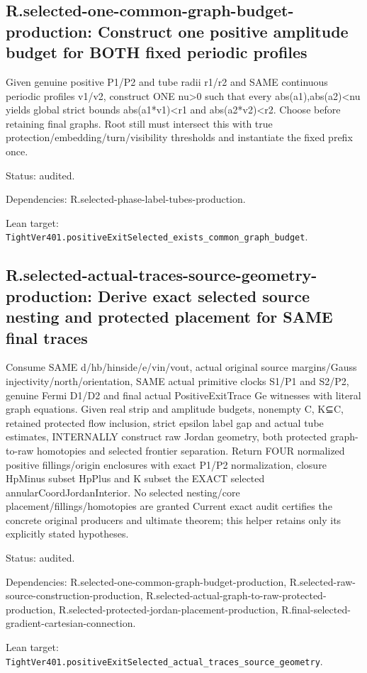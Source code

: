 \documentclass{article}
\begin{document}
\subsection*{R.selected-one-common-graph-budget-production: Construct one positive amplitude budget for BOTH fixed periodic profiles}
Given genuine positive P1/P2 and tube radii r1/r2 and SAME continuous periodic profiles v1/v2, construct ONE nu>0 such that every abs(a1),abs(a2)<nu yields global strict bounds abs(a1*v1)<r1 and abs(a2*v2)<r2. Choose before retaining final graphs. Root still must intersect this with true protection/embedding/turn/visibility thresholds and instantiate the fixed prefix once.
\par Status: audited.
\par Dependencies: R.selected-phase-label-tubes-production.
\par Lean target: \texttt{TightVer401.positiveExitSelected\_exists\_common\_graph\_budget}.
\subsection*{R.selected-actual-traces-source-geometry-production: Derive exact selected source nesting and protected placement for SAME final traces}
Consume SAME d/hb/hinside/e/vin/vout, actual original source margins/Gauss injectivity/north/orientation, SAME actual primitive clocks S1/P1 and S2/P2, genuine Fermi D1/D2 and final actual PositiveExitTrace Ge witnesses with literal graph equations. Given real strip and amplitude budgets, nonempty C, K⊆C, retained protected flow inclusion, strict epsilon label gap and actual tube estimates, INTERNALLY construct raw Jordan geometry, both protected graph-to-raw homotopies and selected frontier separation. Return FOUR normalized positive fillings/origin enclosures with exact P1/P2 normalization, closure HpMinus subset HpPlus and K subset the EXACT selected annularCoordJordanInterior. No selected nesting/core placement/fillings/homotopies are granted Current exact audit certifies the concrete original producers and ultimate theorem; this helper retains only its explicitly stated hypotheses.
\par Status: audited.
\par Dependencies: R.selected-one-common-graph-budget-production, R.selected-raw-source-construction-production, R.selected-actual-graph-to-raw-protected-production, R.selected-protected-jordan-placement-production, R.final-selected-gradient-cartesian-connection.
\par Lean target: \texttt{TightVer401.positiveExitSelected\_actual\_traces\_source\_geometry}.
\end{document}
